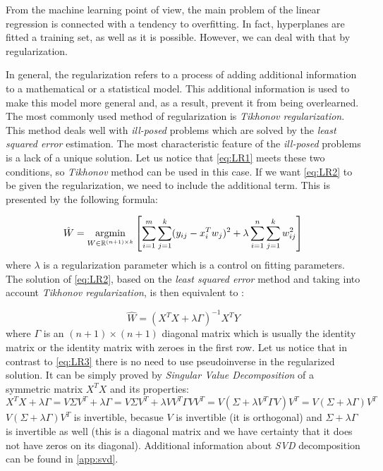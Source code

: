 From the machine learning point of view, the main problem of the linear regression is connected with a tendency to overfitting. In fact, hyperplanes are fitted a training set, as well as it is possible. However, we can deal with that by regularization.

In general, the regularization refers to a process of adding additional information to a mathematical or a statistical model. This additional information is used to make this model more general and, as a result, prevent it from being overlearned. The most commonly used method of regularization is \textit{Tikhonov regularization}. This method deals well with \textit{ill-posed} problems which are solved by the \textit{least squared error} estimation. The most characteristic feature of the \textit{ill-posed} problems is a lack of a unique solution. Let us notice that \cref{eq:LR1} meets these two conditions, so \textit{Tikhonov} method can be used in this case. If we want \cref{eq:LR2} to be given the regularization, we need to include the additional term. This is presented by the following formula:

\begin{equation}\label{eq:LR2}
    \hat{W} = \operatorname*{argmin}_{W \in \mathbb{R}^{(n+1) \times k}}\left[\sum\limits_{i=1}^{m}\sum\limits_{j=1}^{k}(y_{ij}-x^T_iw_j)^2 + \lambda\sum\limits_{i=1}^{n}\sum\limits_{j=1}^{k}w_{ij}^2\right]
\end{equation}
where $\lambda$ is a regularization parameter which is a control on fitting parameters. The solution of \cref{eq:LR2}, based on the \textit{least squared error} method and taking into account \textit{Tikhonov regularization}, is then equivalent to \cite{Tikh}:

\begin{equation}\label{eq:LR3}
    \hat{W} = (X^TX+\lambda\Gamma)^{-1}X^TY
\end{equation}
where $\Gamma$ is an $(n+1)\times(n+1)$ diagonal matrix which is usually the identity matrix or the identity matrix with zeroes in the first row. Let us notice that in contrast to \cref{eq:LR3} there is no need to use pseudoinverse in the regularized solution. It can be simply proved by \textit{Singular Value Decomposition} of a symmetric matrix $X^TX$ and its properties:
\begin{equation}\label{eq:inv_proof}
    X^TX + \lambda\Gamma=V\Sigma{V^T} + \lambda\Gamma = V\Sigma{V^T} + \lambda{V}V^T\Gamma{V}V^T = V(\Sigma + \lambda{V^T}\Gamma{V})V^T = V(\Sigma + \lambda\Gamma)V^T 
\end{equation}
$V(\Sigma + \lambda\Gamma)V^T$ is invertible, becasue $V$ is invertible (it is orthogonal) and $\Sigma +\lambda\Gamma$ is invertible as well (this is a diagonal matrix and we have certainty that it does not have zeros on its diagonal). Additional information about \textit{SVD} decomposition can be found in \cref{app:svd}.

